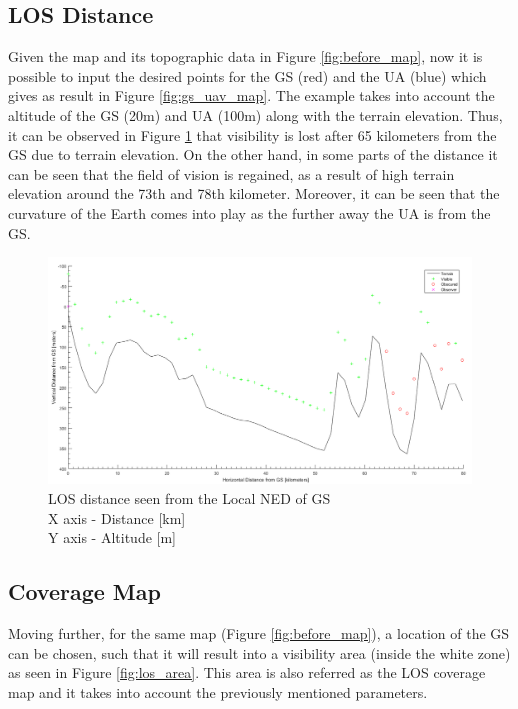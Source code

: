 \subsection{LOS Distance}
Given the map and its topographic data in Figure \ref{fig:before_map}, now it is possible to input the desired points for the GS (red) and the UA (blue) which gives as result in Figure \ref{fig:gs_uav_map}. The example takes into account the altitude of the GS (20m) and UA (100m) along with the terrain elevation. Thus, it can be observed in Figure \ref{fig:los_2p} that visibility is lost after 65 kilometers from the GS due to terrain elevation. On the other hand, in some parts of the distance it can be seen that the field of vision is regained, as a result of high terrain elevation around the 73th and 78th kilometer. Moreover, it can be seen that the curvature of the Earth comes into play as the further away the UA is from the GS.

\begin{figure}[H]
	\centering
	\includegraphics[scale=0.40]{figures/los_2p.png}
	\caption{LOS distance seen from the Local NED of GS \\ X axis - Distance [km] \\ Y axis - Altitude [m]}
   	\label{fig:los_2p}
\end{figure}

\subsection{Coverage Map}
Moving further, for the same map (Figure \ref{fig:before_map}), a location of the GS can be chosen, such that it will result into a visibility area (inside the white zone) as seen in Figure \ref{fig:los_area}. This area is also referred as the LOS coverage map and it takes into account the previously mentioned parameters.


